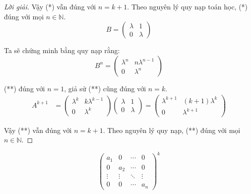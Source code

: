 \begin{proof}[Lời giải]
              Vậy (*) vẫn đúng với $n = k+1$. Theo nguyên lý quy nạp toán học, (*) đúng với mọi $n\in\mathbb{N}$.
              \[
                  B =
                  \begin{pmatrix}
                      \lambda & 1       \\
                      0       & \lambda
                  \end{pmatrix}
              \]
              
              Ta sẽ chứng minh bằng quy nạp rằng:
              \[
                  B^{n} =
                  \begin{pmatrix}
                      \lambda^{n} & n\lambda^{n-1} \\
                      0           & \lambda^{n}
                  \end{pmatrix}
                  \tag{**}
              \]
              
              (**) đúng với $n=1$, giả sử (**) cũng đúng với $n = k$.
              \begin{align*}
                  A^{k+1} & =
                  \begin{pmatrix}
                      \lambda^{k} & k\lambda^{k-1} \\
                      0           & \lambda^{k}
                  \end{pmatrix}
                  \begin{pmatrix}
                      \lambda & 1       \\
                      0       & \lambda
                  \end{pmatrix}
                  =
                  \begin{pmatrix}
                      \lambda^{k+1} & (k+1)\lambda^{k} \\
                      0             & \lambda^{k+1}
                  \end{pmatrix}
              \end{align*}
              
              Vậy (**) vẫn đúng với $n = k+1$. Theo nguyên lý quy nạp, (**) đúng với mọi $n\in\mathbb{N}$.
\end{proof}

\begin{exercise}
    \[
        \begin{pmatrix}
            a_{1}  & 0      & \cdots & 0      \\
            0      & a_{2}  & \cdots & 0      \\
            \vdots & \vdots & \ddots & \vdots \\
            0      & 0      & \cdots & a_{n}
        \end{pmatrix}^{k}
    \]
\end{exercise}

